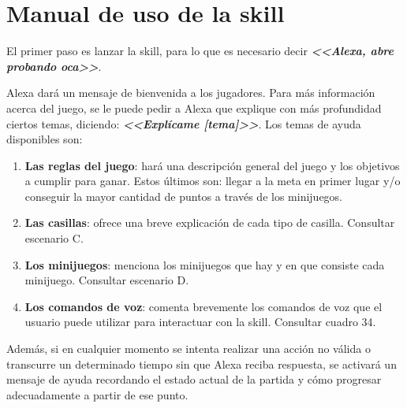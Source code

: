 \section{Manual de uso de la skill}

El primer paso es lanzar la skill, para lo que es necesario decir \textbf{\textit{<<Alexa, abre probando oca>>}}.

Alexa dará un mensaje de bienvenida a los jugadores. Para más información acerca del juego, se le puede pedir a Alexa que explique con más profundidad ciertos temas, diciendo: \textbf{\textit{<<Explícame [tema]>>}}. Los temas de ayuda disponibles son: 
\begin{enumerate}
	\item \textbf{Las reglas del juego}: hará una descripción general del juego y los objetivos a cumplir para ganar. Estos últimos son: llegar a la meta en primer lugar y/o conseguir la mayor cantidad de puntos a través de los minijuegos.
	\item \textbf{Las casillas}: ofrece una breve explicación de cada tipo de casilla. Consultar escenario C.
	\item \textbf{Los minijuegos}: menciona los minijuegos que hay y en que consiste cada minijuego. Consultar escenario D.
	\item \textbf{Los comandos de voz}: comenta brevemente los comandos de voz que el usuario puede utilizar para interactuar con la skill. Consultar cuadro 34.
\end{enumerate}

Además, si en cualquier momento se intenta realizar una acción no válida o transcurre un determinado tiempo sin que Alexa reciba respuesta, se activará un mensaje de ayuda recordando el estado actual de la partida y cómo progresar adecuadamente a partir de ese punto.

